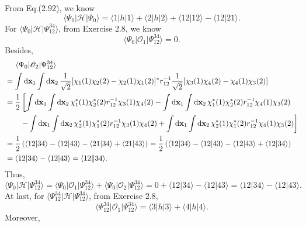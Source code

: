 \documentclass[a4paper]{book}
\newcommand\lr[2]{\langle#1\|#2\rangle}
\newcommand*{\dif}{\mathop{}\!\mathrm{d}}
\newcommand{\bfx}{{\bf x}}
\begin{document}
	\begin{solution}
	From Eq.(2.92), we know
	\begin{equation}
		\langle \Psi_0 | \mathscr{H} | \Psi_0 \rangle = \langle 1 | h | 1 \rangle + \langle 2 | h | 2 \rangle + \langle 12 | 12 \rangle - \langle 12 | 21 \rangle.
	\end{equation}
	For $\langle \Psi_0 | \mathscr{H} | \Psi_{12}^{34} \rangle$, from Exercise 2.8, we know
	\[
		\langle \Psi_0 | \mathscr{O}_1 | \Psi^{34}_{12} \rangle = 0.
	\]
	Besides,
	\begin{align*}
		&\hspace{1.4em}\langle \Psi_0 | \mathscr{O}_2 | \Psi_{12}^{34} \rangle \\
		&=  \int \dif \bfx_1 \int \dif \bfx_2 \, \frac{1}{\sqrt{2}}[ \chi_1(1) \chi_2(2) - \chi_2(1) \chi_1(2) ]^* r^{-1}_{12} \frac{1}{\sqrt{2}}[ \chi_3(1) \chi_4(2) - \chi_4(1) \chi_3(2) ] \\
		&= \frac{1}{2} \left[ \int \dif \bfx_1 \int \dif \bfx_2 \,\chi_1^*(1) \chi^*_2(2) r^{-1}_{12} \chi_3(1) \chi_4(2) - \int \dif \bfx_1 \int \dif \bfx_2 \, \chi_1^*(1) \chi^*_2(2) r^{-1}_{12} \chi_4(1) \chi_3(2) \right. \\
		&\hspace{2em} \left. -\int \dif \bfx_1 \int \dif \bfx_2 \,\chi_2^*(1) \chi^*_1(2) r^{-1}_{12} \chi_3(1) \chi_4(2) + \int \dif \bfx_1 \int \dif \bfx_2 \, \chi_2^*(1) \chi^*_1(2) r^{-1}_{12} \chi_4(1) \chi_3(2) \right] \\
		&= \frac{1}{2} \left( \langle 12 | 34 \rangle - \langle 12 |  43 \rangle - \langle 21 | 34 \rangle + \langle 21 | 43 \rangle \right) = \frac{1}{2} \left( \langle 12 | 34 \rangle - \langle 12 |  43 \rangle - \langle 12 | 43 \rangle + \langle 12 | 34 \rangle \right) \\
		&= \langle 12 | 34 \rangle - \langle 12 | 43 \rangle = \lr{12}{34}.
	\end{align*}
	Thus,
	\begin{equation}
		\langle \Psi_0 | \mathscr{H} | \Psi^{34}_{12} \rangle = \langle \Psi_0 | \mathscr{O}_1 | \Psi^{34}_{12} \rangle + \langle \Psi_0 | \mathscr{O}_2 | \Psi^{34}_{12} \rangle = 0 + \langle 12 | 34 \rangle - \langle 12 |  43 \rangle = \langle 12 | 34 \rangle - \langle 12 | 43 \rangle.
	\end{equation}
	At last, for $\langle \Psi^{34}_{12} | \mathscr{H} | \Psi^{34}_{12} \rangle$, from Exercise 2.8,
	\[
		\langle \Psi^{34}_{12} | \mathscr{O}_1 | \Psi^{34}_{12} \rangle = \langle 3 | h | 3 \rangle + \langle 4 | h | 4 \rangle.
	\]
	Moreover,

\end{solution}
\end{document}
